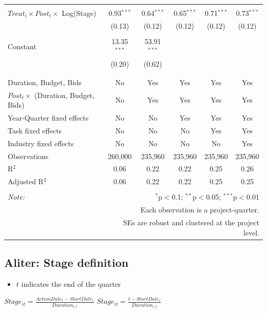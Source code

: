 \documentclass[
]{article}
\providecommand{\tightlist}{%
  \setlength{\itemsep}{0pt}\setlength{\parskip}{0pt}}
\begin{document}
\begin{table}[H]
\begin{tabular}{@{\extracolsep{-2pt}}lccccc}
  & & & & & \\ 
 $Treat_i \times Post_t \times$ Log(Stage) & 0.93$^{***}$ & 0.64$^{***}$ & 0.65$^{***}$ & 0.71$^{***}$ & 0.73$^{***}$ \\ 
  & (0.13) & (0.12) & (0.12) & (0.12) & (0.12) \\ 
  & & & & & \\ 
 Constant & 13.35$^{***}$ & 53.91$^{***}$ &  &  &  \\ 
  & (0.20) & (0.62) &  &  &  \\ 
  & & & & & \\ 
\hline \\[-1.8ex] 
Duration, Budget, Bids & No & Yes & Yes & Yes & Yes \\ 
$Post_t \times $  (Duration, Budget, Bids) & No & Yes & Yes & Yes & Yes \\ 
Year-Quarter fixed effects & No & No & Yes & Yes & Yes \\ 
Task fixed effects & No & No & No & Yes & Yes \\ 
Industry fixed effects & No & No & No & No & Yes \\ 
Observations & 260,000 & 235,960 & 235,960 & 235,960 & 235,960 \\ 
R$^{2}$ & 0.06 & 0.22 & 0.22 & 0.25 & 0.26 \\ 
Adjusted R$^{2}$ & 0.06 & 0.22 & 0.22 & 0.25 & 0.25 \\ 
\hline 
\hline \\[-1.8ex] 
\textit{Note:}  & \multicolumn{5}{r}{$^{*}$p$<$0.1; $^{**}$p$<$0.05; $^{***}$p$<$0.01} \\ 
 & \multicolumn{5}{r}{Each observation is a project-quarter.} \\ 
 & \multicolumn{5}{r}{SEs are robust and clustered at the project level.} \\ 
\end{tabular} 
\end{table}

\hypertarget{aliter-stage-definition}{%
\subsection{Aliter: Stage definition}\label{aliter-stage-definition}}

\begin{itemize}
\tightlist
\item
  \(t\) indicates the end of the quarter
\end{itemize}

\(Stage_{it}=\frac{ActionDate_{t}-StartDate_i}{Duration_{i,t}}\)
\(Stage_{it}=\frac{t-StartDate_i}{Duration_{i,t}}\)
\end{document}
